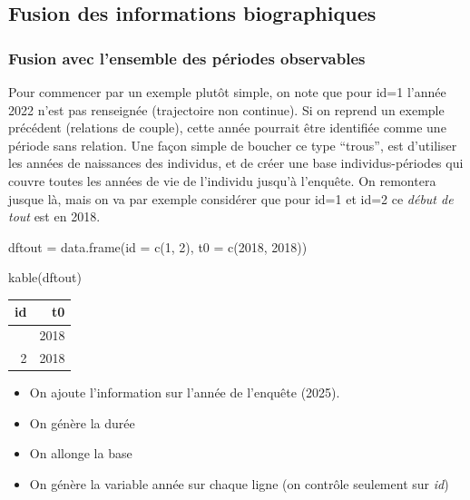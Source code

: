 \documentclass[
  12pt,
  letterpaper,
  DIV=11,
  numbers=noendperiod,
  onepage,
  openany]{scrreprt}
\newenvironment{Shaded}{\begin{snugshade}}{\end{snugshade}}
\newcommand{\AttributeTok}[1]{\textcolor[rgb]{0.80,0.80,0.80}{#1}}
\newcommand{\DecValTok}[1]{\textcolor[rgb]{0.86,0.86,0.80}{#1}}
\newcommand{\FunctionTok}[1]{\textcolor[rgb]{0.94,0.94,0.56}{#1}}
\newcommand{\NormalTok}[1]{\textcolor[rgb]{0.80,0.80,0.80}{#1}}
\newcommand{\OtherTok}[1]{\textcolor[rgb]{0.94,0.94,0.56}{#1}}
\providecommand{\tightlist}{%
  \setlength{\itemsep}{0pt}\setlength{\parskip}{0pt}}\usepackage{longtable,booktabs,array}
\begin{document}
\hypertarget{fusion-des-informations-biographiques}{%
\subsection{Fusion des informations
biographiques}\label{fusion-des-informations-biographiques}}

\hypertarget{fusion-avec-lensemble-des-puxe9riodes-observables}{%
\subsubsection{Fusion avec l'ensemble des périodes
observables}\label{fusion-avec-lensemble-des-puxe9riodes-observables}}

Pour commencer par un exemple plutôt simple, on note que pour id=1
l'année 2022 n'est pas renseignée (trajectoire non continue). Si on
reprend un exemple précédent (relations de couple), cette année pourrait
être identifiée comme une période sans relation. Une façon simple de
boucher ce type ``trous'', est d'utiliser les années de naissances des
individus, et de créer une base individus-périodes qui couvre toutes les
années de vie de l'individu jusqu'à l'enquête. On remontera jusque là,
mais on va par exemple considérer que pour id=1 et id=2 ce \emph{début
de tout} est en 2018.

\begin{Shaded}
\begin{Highlighting}[]
\NormalTok{dftout }\OtherTok{=} \FunctionTok{data.frame}\NormalTok{(}\AttributeTok{id  =}  \FunctionTok{c}\NormalTok{(}\DecValTok{1}\NormalTok{, }\DecValTok{2}\NormalTok{),}
                    \AttributeTok{t0  =}  \FunctionTok{c}\NormalTok{(}\DecValTok{2018}\NormalTok{, }\DecValTok{2018}\NormalTok{))}

\FunctionTok{kable}\NormalTok{(dftout)    }
\end{Highlighting}
\end{Shaded}

\begin{longtable}[]{@{}rr@{}}
\toprule\noalign{}
id & t0 \\
\midrule\noalign{}
\endhead
\bottomrule\noalign{}
\endlastfoot
1 & 2018 \\
2 & 2018 \\
\end{longtable}

\begin{itemize}
\tightlist
\item
  On ajoute l'information sur l'année de l'enquête (2025).
\item
  On génère la durée
\item
  On allonge la base
\item
  On génère la variable année sur chaque ligne (on contrôle seulement
  sur \emph{id})
\end{itemize}
\end{document}
